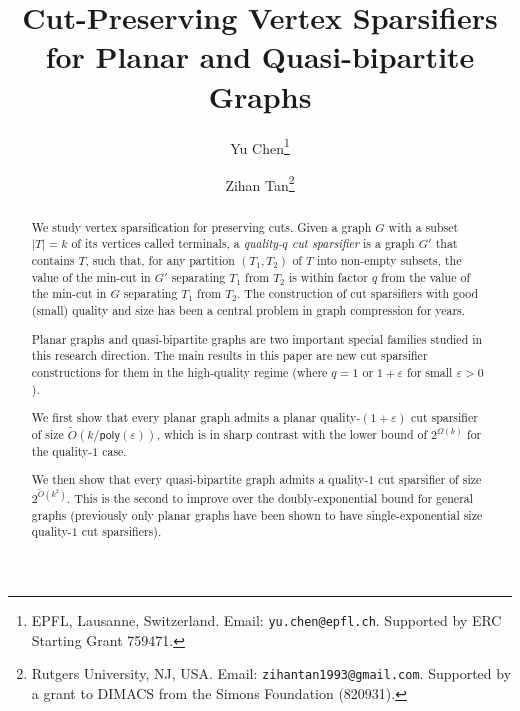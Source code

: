 \documentclass[11pt]{article}
\theoremstyle{definition}
\newcommand{\eps}{{\varepsilon}}
\newcommand{\poly}{\mathsf{poly}}
\begin{document}
\begin{titlepage}
	
	\title{Cut-Preserving Vertex Sparsifiers for Planar and Quasi-bipartite Graphs}
	
	\author{Yu Chen\thanks{EPFL, Lausanne, Switzerland. Email: {\tt yu.chen@epfl.ch}. Supported by ERC Starting Grant 759471.} \and Zihan Tan\thanks{Rutgers University, NJ, USA. Email: {\tt zihantan1993@gmail.com}. Supported by a grant to DIMACS from the Simons Foundation (820931).}} 
	
	\maketitle
	
	
	\thispagestyle{empty}
	\begin{abstract}
We study vertex sparsification for preserving cuts.
Given a graph $G$ with a subset $|T|=k$ of its vertices called terminals, a \emph{quality-$q$ cut sparsifier} is a graph $G'$ that contains $T$, such that, for any partition $(T_1,T_2)$ of $T$ into non-empty subsets, the value of the min-cut in $G'$ separating $T_1$ from $T_2$ is within factor $q$ from the value of the min-cut in $G$ separating $T_1$ from $T_2$. 
The construction of cut sparsifiers with good (small) quality and size has been a central problem in graph compression for years.

Planar graphs and quasi-bipartite graphs are two important special families studied in this research direction.
The main results in this paper are new cut sparsifier constructions for them in the high-quality regime (where $q=1$ or $1+\eps$ for small $\eps>0$).


We first show that every planar graph admits a planar quality-$(1+\eps)$ cut sparsifier of size $\tilde O(k/\poly(\eps))$, which is in sharp contrast with the lower bound of $2^{\Omega(k)}$ for the quality-$1$ case.

We then show that every quasi-bipartite graph admits a quality-$1$ cut sparsifier of size $2^{\tilde O(k^2)}$. This is the second to improve over the doubly-exponential bound for general graphs (previously only planar graphs have been shown to have single-exponential size quality-$1$ cut sparsifiers).


\end{abstract}
\end{titlepage}
\end{document}

